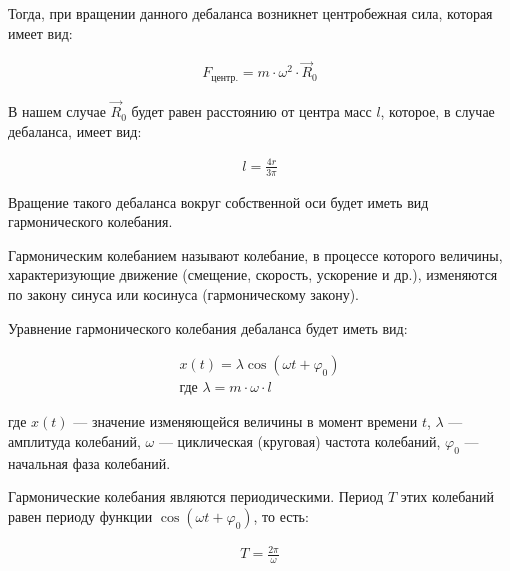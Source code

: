 Тогда, при вращении данного дебаланса возникнет центробежная сила, которая имеет вид:

\begin{equation}\label{eq:centrifugal}
    \begin{gathered}
        F_{\textrm{центр.}} = m \cdot \omega^2 \cdot \vec{R}_0
    \end{gathered}
\end{equation}

В нашем случае $\vec{R}_0$ будет равен расстоянию от центра масс $l$, которое, в случае дебаланса, имеет вид:

\begin{equation}\label{eq:distance_mass}
    \begin{gathered}
        l = \frac{4 r}{3 \pi}
    \end{gathered}
\end{equation}

Вращение такого дебаланса вокруг собственной оси будет иметь вид гармонического колебания.

\begin{definition}
    Гармоническим колебанием называют колебание, в процессе которого величины, характеризующие движение (смещение, скорость, ускорение и др.), изменяются по закону синуса или косинуса (гармоническому закону).
\end{definition}

Уравнение гармонического колебания дебаланса будет иметь вид:

\begin{equation}\label{eq:harmonic}
    \begin{gathered}
        x(t) = \lambda \cos (\omega t + \varphi_0) \\
        \textrm{где } \lambda = m \cdot \omega \cdot l
    \end{gathered}
\end{equation}

где $x(t)$  — значение изменяющейся величины в момент времени $t$, $\lambda$ — амплитуда колебаний, $\omega$ — циклическая (круговая) частота колебаний, $\varphi_0$ — начальная фаза колебаний.

Гармонические колебания являются периодическими. Период $T$ этих колебаний равен периоду функции $\cos (\omega t + \varphi_0)$, то есть:

\begin{equation*}
    \begin{aligned}
        T = \frac{2 \pi}{\omega}
    \end{aligned}
\end{equation*}

